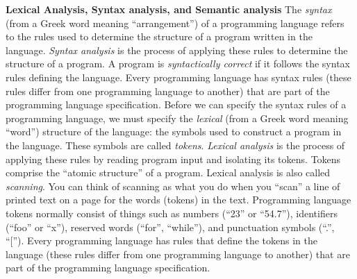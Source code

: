 \begin{minipage}[t]{\sw}
\slidenumber
\LARGE
{\bf Lexical Analysis, Syntax analysis, and Semantic analysis}\exx
The {\em syntax} (from a Greek word meaning ``arrangement'')
of a programming language refers
to the rules used to determine the structure
of a program written in the language.
{\em Syntax analysis} is the process
of applying these rules to determine the structure of a program.
A program is {\em syntactically correct}
if it follows the syntax rules defining the language.
Every programming language has syntax rules
(these rules differ from one programming language to another)
that are part of the programming language specification.\exx
Before we can specify the syntax rules of a programming language,
we must specify the {\em lexical} (from a Greek word meaning ``word'')
structure of the language:
the symbols used to construct a program in the language.
These symbols are called {\em tokens}.
{\em Lexical analysis} is the process of applying these rules
by reading program input and isolating its tokens.
Tokens comprise the ``atomic structure'' of a program.\exx
Lexical analysis is also called {\em scanning}.
You can think of scanning as what you do
when you ``scan'' a line of printed text on a page
for the words (tokens) in the text.
Programming language tokens normally consist
of things such as numbers (``23'' or ``54.7''),
identifiers (``foo'' or ``x''),
reserved words (``for'', ``while''),
and punctuation symbols (``.'', ``['').
Every programming language has rules that define
the tokens in the language
(these rules differ from one programming language to another)
that are part of the programming language specification.\exx
\end{minipage}
\clearpage
